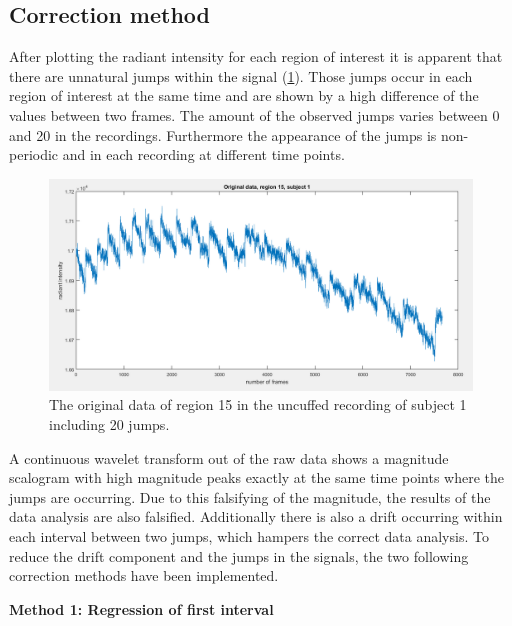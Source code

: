 \subsection{Correction method}

After plotting the radiant intensity for each region of interest it is apparent that there are unnatural jumps within the signal (\ref{fig:raw15}). Those jumps occur in each region of interest at the same time and are shown by a high difference of the values between two frames. The amount of the observed jumps varies between 0 and 20 in the recordings. Furthermore the appearance of the jumps is non-periodic and in each recording at different time points.
\begin{figure}[H]
	\includegraphics[width=1\textwidth]{figures/raw15}
	\caption{The original data of region 15 in the uncuffed recording of subject 1 including 20 jumps.}
	\label{fig:raw15}
\end{figure}
A continuous wavelet transform out of the raw data shows a magnitude scalogram with high magnitude peaks exactly at the same time points where the jumps are occurring. Due to this falsifying of the magnitude, the results of the data analysis are also falsified.
Additionally there is also a drift occurring within each interval between two jumps, which hampers the correct data analysis. To reduce the drift component and the jumps in the signals, the two following correction methods have been implemented.

\textbf{Method 1: Regression of first interval}


